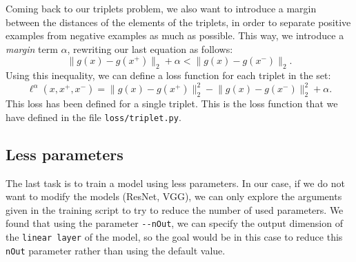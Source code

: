 \documentclass[a4paper]{article}
\newcommand{\norm}[1]{\lVert #1 \rVert}
\def\inline{\lstinline[basicstyle=\ttfamily,keywordstyle={}]}
\newcommand{\ps}{x^+}
\newcommand{\ns}{x^-}
\begin{document}
Coming back to our triplets problem, we also want to introduce a margin between the distances of the elements of the triplets, in order to separate positive examples from negative examples as much as possible. This way, we introduce a \emph{margin} term $\alpha$, rewriting our last equation as follows:
\[
\norm{g(x) - g(\ps)}_2 + \alpha < \norm{g(x) - g(\ns)}_2.
\]
Using this inequality, we can define a loss function for each triplet in the set:
\begin{equation}\label{triplet:single:loss}
\ell^\alpha (x,\ps,\ns) =  \norm{g(x) - g(\ps)}_2^2 - \norm{g(x) - g(\ns)}_2^2 + \alpha.
\end{equation}
This loss has been defined for a single triplet. This is the loss function that we have defined in the file \inline{loss/triplet.py}.


\subsection{Less parameters}

The last task is to train a model using less parameters. In our case, if we do not want to modify the models (ResNet, VGG), we can only explore the arguments given in the training script to try to reduce the number of used parameters. We found that using the parameter \inline{--nOut}, we can specify the output dimension of the \inline{linear layer} of the model, so the goal would be in this case to reduce this \inline{nOut} parameter rather than using the default value.
\printbibliography
\end{document}
